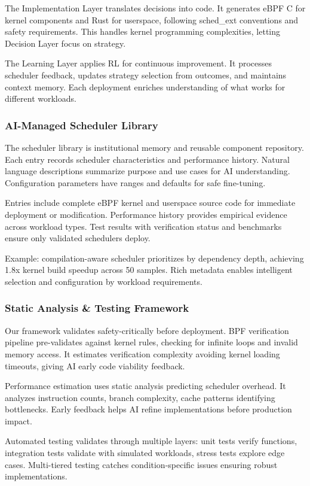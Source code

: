 The Implementation Layer translates decisions into code. It generates eBPF C for kernel components and Rust for userspace, following sched\_ext conventions and safety requirements. This handles kernel programming complexities, letting Decision Layer focus on strategy.

The Learning Layer applies RL for continuous improvement. It processes scheduler feedback, updates strategy selection from outcomes, and maintains context memory. Each deployment enriches understanding of what works for different workloads.

\subsubsection{AI-Managed Scheduler Library}
The scheduler library is institutional memory and reusable component repository. Each entry records scheduler characteristics and performance history. Natural language descriptions summarize purpose and use cases for AI understanding. Configuration parameters have ranges and defaults for safe fine-tuning.

Entries include complete eBPF kernel and userspace source code for immediate deployment or modification. Performance history provides empirical evidence across workload types. Test results with verification status and benchmarks ensure only validated schedulers deploy.

Example: compilation-aware scheduler prioritizes by dependency depth, achieving 1.8x kernel build speedup across 50 samples. Rich metadata enables intelligent selection and configuration by workload requirements.

\subsubsection{Static Analysis \& Testing Framework}
Our framework validates safety-critically before deployment. BPF verification pipeline pre-validates against kernel rules, checking for infinite loops and invalid memory access. It estimates verification complexity avoiding kernel loading timeouts, giving AI early code viability feedback.

Performance estimation uses static analysis predicting scheduler overhead. It analyzes instruction counts, branch complexity, cache patterns identifying bottlenecks. Early feedback helps AI refine implementations before production impact.

Automated testing validates through multiple layers: unit tests verify functions, integration tests validate with simulated workloads, stress tests explore edge cases. Multi-tiered testing catches condition-specific issues ensuring robust implementations.

